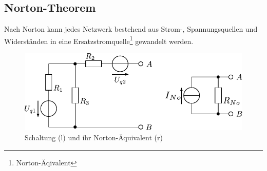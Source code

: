 \subsection{Norton-Theorem}
Nach Norton kann jedes Netzwerk bestehend aus Strom-, Spannungsquellen und Widerständen in eine Ersatzstromquelle\footnote{Norton-Äqivalent} gewandelt werden.

\begin{figure}[h!]
\centering
\includegraphics[scale=\schscale]{norton_sch_2.pdf}
\caption{Schaltung (l) und ihr Norton-Äquivalent (r)}
\label{sch:norton}
\end{figure}
